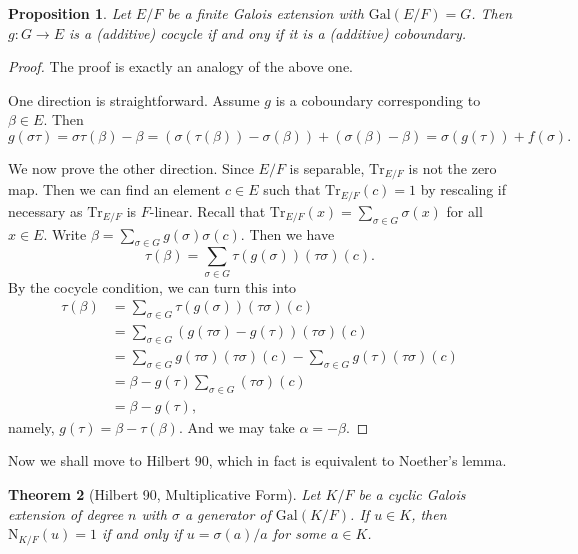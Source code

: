 \documentclass[12pt]{report}
\newtheorem{theorem}{Theorem}[section]
\newtheorem{proposition}[theorem]{Proposition}
{\theoremstyle{remark}\newtheorem*{remark}{Remark}}
\theoremstyle{definition}
\newcommand{\Gal}{\text{Gal}}
\newcommand{\Tr}{\text{Tr}}
\newcommand{\nm}{\text{N}}
\begin{document}
\begin{proposition}
	Let $E/F$ be a finite Galois extension with $\Gal(E/F)=G$. Then $g: G\to E$ is a (additive) cocycle if and ony if it is a (additive) coboundary.
\end{proposition}

\begin{proof}
	The proof is exactly an analogy of the above one.

	One direction is straightforward. Assume $g$ is a coboundary corresponding to $\beta\in E$. Then
	$$g(\sigma\tau)=\sigma\tau(\beta)-\beta =(\sigma(\tau(\beta))-\sigma(\beta))+(\sigma(\beta)-\beta)=\sigma(g(\tau))+ f(\sigma).$$


	We now prove the other direction. Since $E/F$ is separable, $\Tr_{E/F}$ is not the zero map. Then we can find an element $c\in E$ such that $\Tr_{E/F}(c)=1$ by rescaling if necessary as $\Tr_{E/F}$ is $F$-linear. Recall that $\Tr_{E/F}(x)=\sum_{\sigma\in G}\sigma(x)$ for all $x\in E$. Write $\beta=\sum_{\sigma\in G}g(\sigma)\sigma(c)$. Then we have $$\tau(\beta)=\sum_{\sigma\in G}\tau(g(\sigma))(\tau\sigma)(c).$$ By the cocycle condition, we can turn this into
	\begin{align*}
		\tau(\beta) & =\sum_{\sigma\in G}\tau(g(\sigma))(\tau\sigma)(c)                                        \\
		            & =\sum_{\sigma\in G}(g(\tau\sigma)-g(\tau))(\tau\sigma)(c)                                \\
		            & =\sum_{\sigma\in G}g(\tau\sigma)(\tau\sigma)(c)-\sum_{\sigma\in G}g(\tau)(\tau\sigma)(c) \\
		            & =\beta-g(\tau)\sum_{\sigma\in G}(\tau\sigma)(c)                                          \\
		            & = \beta-g(\tau),
	\end{align*}
	namely, $g(\tau)=\beta-\tau(\beta)$. And we may take $\alpha=-\beta$.
\end{proof}

Now we shall move to Hilbert 90, which in fact is equivalent to Noether's lemma.

\begin{theorem}[Hilbert 90, Multiplicative Form]
	Let $K/F$ be a cyclic Galois extension of degree $n$ with $\sigma$ a generator of $\Gal(K/F)$. If $u\in K$, then $\nm_{K/F}(u)=1$ if and only if $u=\sigma(a)/a$ for some $a\in K$.
\end{theorem}
\end{document}
